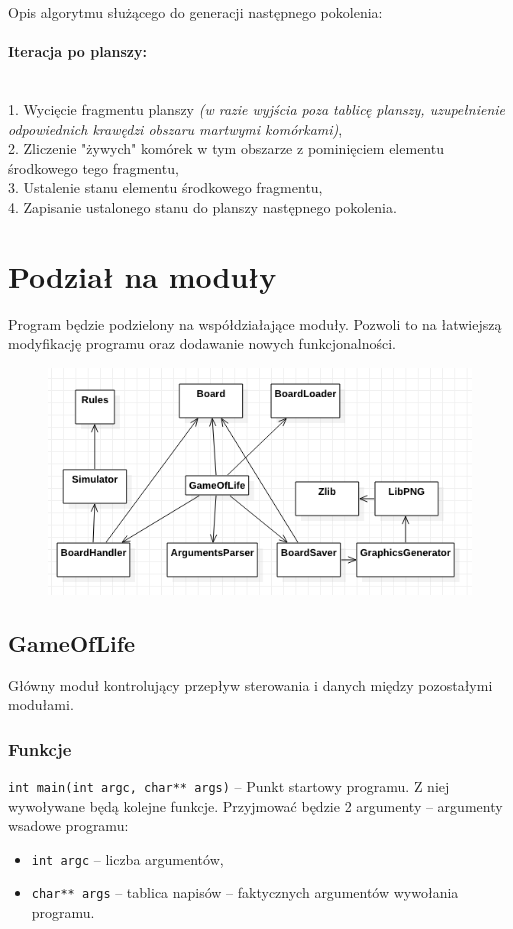 \documentclass{article}
\begin{document}
Opis algorytmu służącego do generacji następnego pokolenia:

\noindent\paragraph{Iteracja po planszy:}\mbox{}\\
	1. Wycięcie fragmentu planszy
		\textit{(w razie wyjścia poza tablicę planszy, uzupełnienie odpowiednich krawędzi obszaru martwymi komórkami)},\\
	2. Zliczenie "żywych" komórek w tym obszarze z pominięciem elementu środkowego tego fragmentu,\\
	3. Ustalenie stanu elementu środkowego fragmentu,\\
	4. Zapisanie ustalonego stanu do planszy następnego pokolenia.\\


\section{Podział na moduły}
Program będzie podzielony na współdziałające moduły. Pozwoli to na łatwiejszą modyfikację programu oraz dodawanie nowych funkcjonalności.

\begin{figure}
	\centering
	\def\svgwidth{\columnwidth}
	\includegraphics[width=13cm]{diagram_modolow.png}
\end{figure}	

\subsection{GameOfLife}
Główny moduł kontrolujący przepływ sterowania i danych między pozostałymi modułami.

\subsubsection{Funkcje}
\texttt{int main(int argc, char** args)} -- Punkt startowy programu. Z niej wywoływane będą kolejne funkcje. Przyjmować będzie 2 argumenty -- argumenty wsadowe programu:
\begin{itemize}[label={}]
	\item\texttt{int argc} -- liczba argumentów,
	\item\texttt{char** args} -- tablica napisów -- faktycznych argumentów wywołania programu.
\end{itemize}
\end{document}
